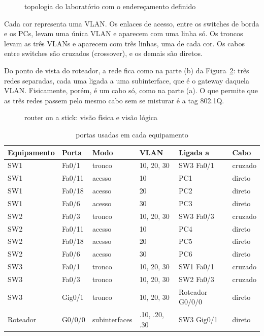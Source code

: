 \begin{figure}[tbp]
\captionsetup{position=top}
\caption{topologia do laboratório com o endereçamento definido}\label{fig:topo}
\centering
\resizebox{\textwidth}{!}{}
\fonte
\end{figure}

Cada cor representa uma VLAN. Os enlaces de acesso, entre os switches de borda e os PCs, levam uma única VLAN e aparecem com uma linha só. Os troncos levam as três VLANs e aparecem com três linhas, uma de cada cor. Os cabos entre switches são cruzados (crossover), e os demais são diretos.

Do ponto de vista do roteador, a rede fica como na parte (b) da Figura~\ref{fig:logica}: três redes separadas, cada uma ligada a uma subinterface, que é o gateway daquela VLAN. Fisicamente, porém, é um cabo só, como na parte (a). O que permite que as três redes passem pelo mesmo cabo sem se misturar é a tag 802.1Q.

\begin{figure}[tbp]
\captionsetup{position=top}
\caption{router on a stick: visão física e visão lógica}\label{fig:logica}
\centering
\resizebox{\textwidth}{!}{}
\fonte
\end{figure}


\begin{table}[H]
\caption{portas usadas em cada equipamento}\label{tab:portas}
\small\renewcommand{\arraystretch}{1.2}
\begin{tabularx}{\textwidth}{@{}llll>{\raggedright\arraybackslash}Xl@{}}
\toprule
\textbf{Equipamento} & \textbf{Porta} & \textbf{Modo} & \textbf{VLAN} & \textbf{Ligada a} & \textbf{Cabo}\\
\midrule
SW1 & Fa0/1 & tronco & 10, 20, 30 & SW3 Fa0/1 & cruzado\\
SW1 & Fa0/11 & acesso & 10 & PC1 & direto\\
SW1 & Fa0/18 & acesso & 20 & PC2 & direto\\
SW1 & Fa0/6 & acesso & 30 & PC3 & direto\\
\midrule
SW2 & Fa0/3 & tronco & 10, 20, 30 & SW3 Fa0/3 & cruzado\\
SW2 & Fa0/11 & acesso & 10 & PC4 & direto\\
SW2 & Fa0/18 & acesso & 20 & PC5 & direto\\
SW2 & Fa0/6 & acesso & 30 & PC6 & direto\\
\midrule
SW3 & Fa0/1 & tronco & 10, 20, 30 & SW1 Fa0/1 & cruzado\\
SW3 & Fa0/3 & tronco & 10, 20, 30 & SW2 Fa0/3 & cruzado\\
SW3 & Gig0/1 & tronco & 10, 20, 30 & Roteador G0/0/0 & direto\\
\midrule
Roteador & G0/0/0 & subinterfaces & .10, .20, .30 & SW3 Gig0/1 & direto\\
\bottomrule
\end{tabularx}
\fonte
\end{table}

